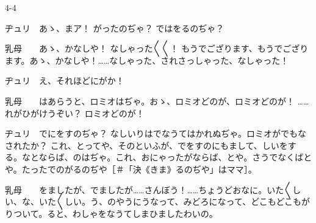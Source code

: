 \documentclass[tate,paper=b6j,jafontsize=9pt]{jlreq}
\begin{document}
\begin{azconvIndented}{4\zw}{-4\zw}

ヂュリ　あゝ、まア！ がったのぢゃ？ ではをるのぢゃ？

乳母　　あゝ、かなしや！ なしゃった{〳〵}{〳〵}！ もうでござります、もうでござります。あゝ、かなしや！……なしゃった、されさっしゃった、なしゃった！

ヂュリ　え、それほどにがか！

乳母　　はあらうと、ロミオはぢゃ。おゝ、ロミオどのが、ロミオどのが！ ……れがひがけうぞい？ ロミオどのが！

ヂュリ　でにをすのぢゃ？ なしいりはでなうてはかれぬぢゃ。ロミオがでもなされたか？ これ、とってや、そのといふが、でをすのにもまして、しいをする。なとならば、のはぢゃ。これ、おにゃったがならば、とや。さうでなくばとや。たったでのがるのぢや{\small ［＃「決《きま》るのぢや」はママ］}。

乳母　　をましたが、でましたが……さんぼう！……ちょうどおなに。いた{〳〵}しい、な、いた{〳〵}しい。う、のやうにうなって、みどろになって、どこもどこもがりついて。ると、わしゃをなうてしまひましたわいの。


\end{azconvIndented}
\end{document}
